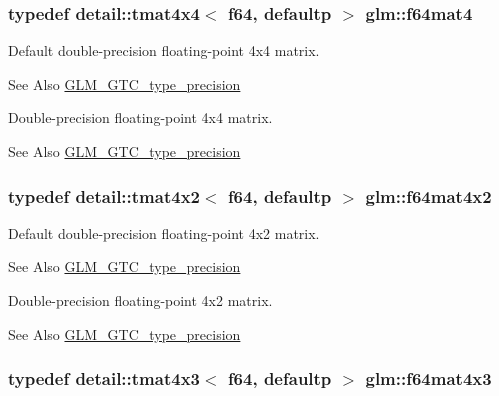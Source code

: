 \hypertarget{group__gtc__type__precision_ga1e2d73ea989e6a5abd90cbe9f1025a41}{
\subsubsection[{f64mat4}]{\setlength{\rightskip}{0pt plus 5cm}typedef detail\-::tmat4x4$<$ f64, defaultp $>$ {\bf glm\-::f64mat4}}}\label{group__gtc__type__precision_ga1e2d73ea989e6a5abd90cbe9f1025a41}
Default double-\/precision floating-\/point 4x4 matrix. \begin{DoxySeeAlso}{See Also}
\hyperlink{group__gtc__type__precision}{G\-L\-M\-\_\-\-G\-T\-C\-\_\-type\-\_\-precision}
\end{DoxySeeAlso}
Double-\/precision floating-\/point 4x4 matrix. \begin{DoxySeeAlso}{See Also}
\hyperlink{group__gtc__type__precision}{G\-L\-M\-\_\-\-G\-T\-C\-\_\-type\-\_\-precision} 
\end{DoxySeeAlso}
\hypertarget{group__gtc__type__precision_gae716a8717cc6af191aec562d93ff6299}{
\subsubsection[{f64mat4x2}]{\setlength{\rightskip}{0pt plus 5cm}typedef detail\-::tmat4x2$<$ f64, defaultp $>$ {\bf glm\-::f64mat4x2}}}\label{group__gtc__type__precision_gae716a8717cc6af191aec562d93ff6299}
Default double-\/precision floating-\/point 4x2 matrix. \begin{DoxySeeAlso}{See Also}
\hyperlink{group__gtc__type__precision}{G\-L\-M\-\_\-\-G\-T\-C\-\_\-type\-\_\-precision}
\end{DoxySeeAlso}
Double-\/precision floating-\/point 4x2 matrix. \begin{DoxySeeAlso}{See Also}
\hyperlink{group__gtc__type__precision}{G\-L\-M\-\_\-\-G\-T\-C\-\_\-type\-\_\-precision} 
\end{DoxySeeAlso}
\hypertarget{group__gtc__type__precision_gaca283f88500d9895afb939516e7372d1}{
\subsubsection[{f64mat4x3}]{\setlength{\rightskip}{0pt plus 5cm}typedef detail\-::tmat4x3$<$ f64, defaultp $>$ {\bf glm\-::f64mat4x3}}}\label{group__gtc__type__precision_gaca283f88500d9895afb939516e7372d1}
